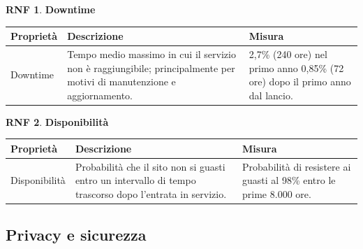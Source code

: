 \documentclass[11pt, a4paper]{article}
\theoremstyle{definition} %
\newtheorem{nonfuncreq}{RNF} %
\begin{document}
\begin{nonfuncreq}
    \textbf{Downtime }
    \begin{center}
        \footnotesize
        \begin{tabularx}{\textwidth}{|X||X||X|}
            \hline
            \cellcolor{red!70}Proprietà & \cellcolor{red!70}Descrizione & \cellcolor{red!70}Misura\\
            \hline
            Downtime & Tempo medio massimo in cui il servizio non è raggiungibile; principalmente per motivi di manutenzione e aggiornamento. & 2,7\% (240 ore) nel primo anno 0,85\% (72 ore) dopo il primo anno dal lancio.\\
            \hline
        \end{tabularx}
    \end{center}
\end{nonfuncreq}

\begin{nonfuncreq}
    \textbf{Disponibilità }
    \begin{center}
        \footnotesize
        \begin{tabularx}{\textwidth}{|X||X||X|}
            \hline
            \cellcolor{red!70}Proprietà & \cellcolor{red!70}Descrizione & \cellcolor{red!70}Misura\\
            \hline
            Disponibilità & Probabilità che il sito non si guasti entro un intervallo di tempo trascorso dopo l'entrata in servizio. & Probabilità di resistere ai guasti al 98\% entro le prime 8.000 ore.\\
            \hline
        \end{tabularx}
    \end{center}
\end{nonfuncreq}

\subsection{Privacy e sicurezza}
\end{document}
